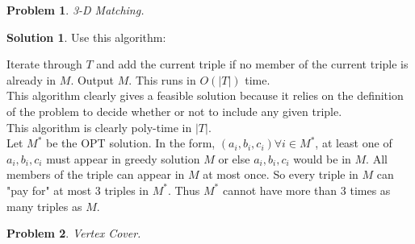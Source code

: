 \documentclass{article}
\newtheorem{problem}{Problem}
\theoremstyle{definition}
\newtheorem*{solution}{Solution}
\begin{document}
\begin{problem} 

3-D Matching.

\end{problem}

\begin{solution}

Use this algorithm:

Iterate through \(T\) and add the current triple if no member of the current triple is already in \(M\). Output \(M\). This runs in \(O(|T|)\) time. \\

This algorithm clearly gives a feasible solution because it relies on the definition of the problem to decide whether or not to include any given triple. \\

This algorithm is clearly poly-time in \(|T|\). \\

Let \(M^*\) be the OPT solution. In the form, \((a_i, b_i, c_i) \forall i\in M^*\), at least one of \(a_i, b_i, c_i\) must appear in greedy solution \(M\) or else \(a_i, b_i, c_i\) would be in \(M\). All members of the triple can appear in \(M\) at most once. So every triple in \(M\) can "pay for" at most 3 triples in \(M^*\). Thus \(M^*\) cannot have more than 3 times as many triples as \(M\).

\end{solution}

\begin{problem} 

Vertex Cover.

\end{problem}
\end{document}
